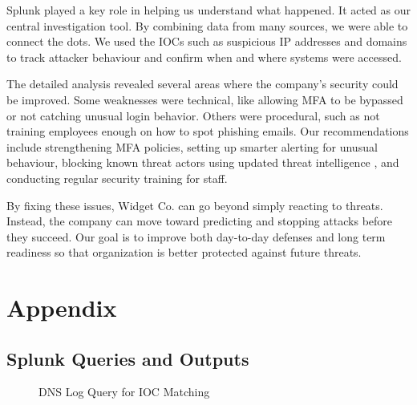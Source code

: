\documentclass[11pt]{article}
\begin{document}
	\vspace{1em}
	\par Splunk played a key role in helping us understand what happened. It acted as our central investigation tool. By combining data from many sources, we were able to connect the dots. We used the IOCs such as suspicious IP addresses and domains to track attacker behaviour and confirm when and where systems were accessed.
	
	\vspace{1em}
	\par The detailed analysis revealed several areas where the company’s security could be improved. Some weaknesses were technical, like allowing MFA to be bypassed or not catching unusual login behavior. Others were procedural, such as not training employees enough on how to spot phishing emails. Our recommendations include strengthening MFA policies, setting up smarter alerting for unusual behaviour, blocking known threat actors using updated threat intelligence , and conducting regular security training for staff.
	
	\vspace{1em}
	\par By fixing these issues, Widget Co. can go beyond simply reacting to threats. Instead, the company can move toward predicting and stopping attacks before they succeed. Our goal is to improve both day-to-day defenses and long term readiness so that organization is better protected against future threats.
	
	\newpage
	\section{Appendix}
	\subsection{Splunk Queries and Outputs}
	
	\renewcommand{\thefigure}{A\arabic{figure}}
	\setcounter{figure}{0}
	\begin{figure}[h]
		\centering
		\caption{DNS Log Query for IOC Matching}
		\label{fig: A1}
	\end{figure}
	
\end{document}
